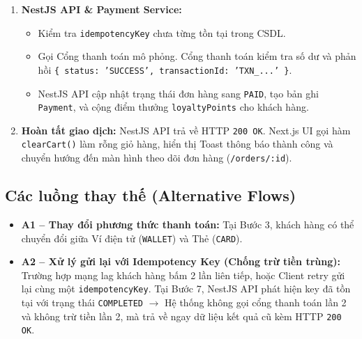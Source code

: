 \documentclass[12pt,a4paper]{article}
\begin{document}
\begin{enumerate}[leftmargin=*,itemsep=4pt]
    \item \textbf{NestJS API \& Payment Service:}
    \begin{itemize}[itemsep=1pt]
        \item Kiểm tra \texttt{idempotencyKey} chưa từng tồn tại trong CSDL.
        \item Gọi Cổng thanh toán mô phỏng. Cổng thanh toán kiểm tra số dư và phản hồi \texttt{\{ status: 'SUCCESS', transactionId: 'TXN\_...' \}}.
        \item NestJS API cập nhật trạng thái đơn hàng sang \texttt{PAID}, tạo bản ghi \texttt{Payment}, và cộng điểm thưởng \texttt{loyaltyPoints} cho khách hàng.
    \end{itemize}
    \item \textbf{Hoàn tất giao dịch:} NestJS API trả về HTTP \texttt{200 OK}. Next.js UI gọi hàm \texttt{clearCart()} làm rỗng giỏ hàng, hiển thị Toast thông báo thành công và chuyển hướng đến màn hình theo dõi đơn hàng (\texttt{/orders/:id}).
\end{enumerate}

\subsection{Các luồng thay thế (Alternative Flows)}
\begin{itemize}[leftmargin=*,itemsep=3pt]
    \item \textbf{A1 -- Thay đổi phương thức thanh toán:} Tại Bước 3, khách hàng có thể chuyển đổi giữa Ví điện tử (\texttt{WALLET}) và Thẻ (\texttt{CARD}).
    \item \textbf{A2 -- Xử lý gửi lại với Idempotency Key (Chống trừ tiền trùng):} Trường hợp mạng lag khách hàng bấm 2 lần liên tiếp, hoặc Client retry gửi lại cùng một \texttt{idempotencyKey}. Tại Bước 7, NestJS API phát hiện key đã tồn tại với trạng thái \texttt{COMPLETED} $\rightarrow$ Hệ thống không gọi cổng thanh toán lần 2 và không trừ tiền lần 2, mà trả về ngay dữ liệu kết quả cũ kèm HTTP \texttt{200 OK}.
\end{itemize}
\end{document}

